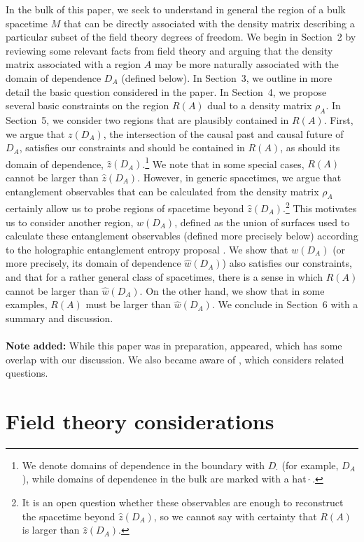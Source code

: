 \documentclass[12pt]{article}
\renewcommand{\(}{\left(}
\renewcommand{\)}{\right)}
\begin{document}
In the bulk of this paper, we seek to understand in general the region of a bulk spacetime $M$ that can be directly associated with the density matrix describing a particular subset of the field theory degrees of freedom. We begin in Section~2 by reviewing some relevant facts from field theory and arguing that the density matrix associated with a region $A$ may be more naturally associated with the domain of dependence $D_A$ (defined below). In Section~3, we outline in more detail the basic question considered in the paper. In Section~4, we propose several basic constraints on the region $R(A)$ dual to a density matrix $\rho_A$. In Section~5, we consider two regions that are plausibly contained in $R(A)$. First, we argue that $z(D_A)$, the intersection of the causal past and causal future of $D_A$, satisfies our constraints and should be contained in $R(A)$, as should its domain of dependence, $\hat{z}(D_A)$.\footnote{We denote domains of dependence in the boundary with $D_\cdot$ (for example, $D_A$), while domains of dependence in the bulk are marked with a hat $\hat{\phantom{.}}$.} We note that in some special cases, $R(A)$ cannot be larger than $\hat z(D_A)$. However, in generic spacetimes, we argue that entanglement observables that can be calculated from the density matrix $\rho_A$ certainly allow us to probe regions of spacetime beyond $\hat
z(D_A)$.\footnote{It is an open question whether these observables are enough to reconstruct the spacetime beyond $\hat z(D_A)$, so we cannot say with certainty that $R(A)$ is larger than $\hat{z}(D_A)$.} This motivates us to consider another region, $w(D_A)$, defined as the union of surfaces used to calculate these entanglement observables (defined more precisely below) according to the holographic entanglement entropy proposal \cite{Ryu:2006bv, Hubeny:2007xt}. We show that $w(D_A)$ (or more precisely, its domain of dependence $\hat{w}(D_A)$) also satisfies our constraints, and that for a rather general class of spacetimes, there is a sense in which $R(A)$ cannot be larger than $\hat{w}(D_A)$. On the other hand, we show that in some examples, $R(A)$ must be larger than $\hat{w}(D_A)$. We conclude in Section~6 with a summary and discussion.
\\
\\
{\bf Note added:} While this paper was in preparation, \cite{Bousso:2012sj} appeared, which has some overlap with our discussion. We also became aware of \cite{HRnew}, which considers related questions.


\section{Field theory considerations}
\end{document}
